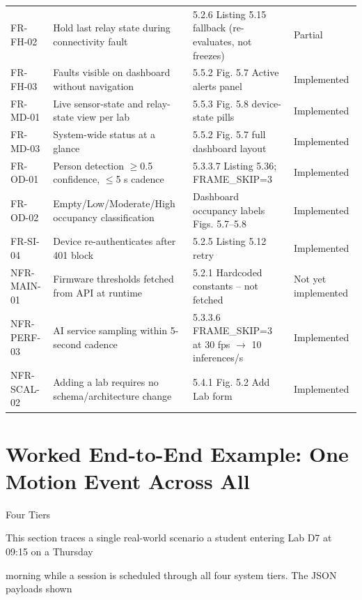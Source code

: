 \begin{longtable}{llll}
	FR-FH-02    & Hold last relay state during connectivity fault        & 5.2.6 Listing 5.15 fallback (re-evaluates, not freezes)       & Partial             \\
	FR-FH-03    & Faults visible on dashboard without navigation         & 5.5.2 Fig. 5.7 Active alerts panel                            & Implemented         \\
	FR-MD-01    & Live sensor-state and relay-state view per lab         & 5.5.3 Fig. 5.8 device-state pills                             & Implemented         \\
	FR-MD-03    & System-wide status at a glance                         & 5.5.2 Fig. 5.7 full dashboard layout                          & Implemented         \\
	FR-OD-01    & Person detection $\ge$0.5 confidence, $\le$5 s cadence & 5.3.3.7 Listing 5.36; FRAME\_SKIP=3                           & Implemented         \\
	FR-OD-02    & Empty/Low/Moderate/High occupancy classification       & Dashboard occupancy labels Figs. 5.7--5.8                     & Implemented         \\
	FR-SI-04    & Device re-authenticates after 401 block                & 5.2.5 Listing 5.12 retry                                      & Implemented         \\
	NFR-MAIN-01 & Firmware thresholds fetched from API at runtime        & 5.2.1 Hardcoded constants -- not fetched                      & Not yet implemented \\
	NFR-PERF-03 & AI service sampling within 5-second cadence            & 5.3.3.6 FRAME\_SKIP=3 at 30 fps $\rightarrow$ 10 inferences/s & Implemented         \\
	NFR-SCAL-02 & Adding a lab requires no schema/architecture change    & 5.4.1 Fig. 5.2 Add Lab form                                   & Implemented         \\
\end{longtable}


\section{Worked End-to-End Example: One Motion Event Across All}
Four Tiers

This section traces a single real-world scenario  a student entering Lab D7 at 09:15 on a Thursday

morning while a session is scheduled  through all four system tiers. The JSON payloads shown

